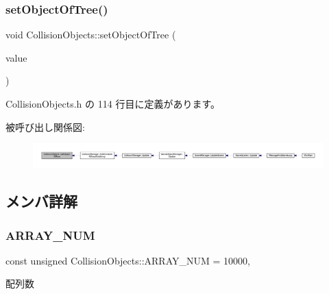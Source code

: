 \subsubsection{\texorpdfstring{set\+Object\+Of\+Tree()}{setObjectOfTree()}}
{\footnotesize\ttfamily void Collision\+Objects\+::set\+Object\+Of\+Tree (\begin{DoxyParamCaption}\item[{\mbox{\hyperlink{class_object_of_tree}{Object\+Of\+Tree}}$<$ \mbox{\hyperlink{class_collision_objects}{Collision\+Objects}} $\ast$$>$ $\ast$}]{value }\end{DoxyParamCaption})\hspace{0.3cm}{\ttfamily [inline]}}



 Collision\+Objects.\+h の 114 行目に定義があります。

被呼び出し関係図\+:
\nopagebreak
\begin{figure}[H]
\begin{center}
\leavevmode
\includegraphics[width=350pt]{class_collision_objects_a3d5a69741d66dcdebfae5a54a15c4b88_icgraph}
\end{center}
\end{figure}


\subsection{メンバ詳解}
\mbox{\label{class_collision_objects_a907cb151a9bbdd323eba56a4e4e1ee76}} 
\subsubsection{\texorpdfstring{A\+R\+R\+A\+Y\+\_\+\+N\+UM}{ARRAY\_NUM}}
{\footnotesize\ttfamily const unsigned Collision\+Objects\+::\+A\+R\+R\+A\+Y\+\_\+\+N\+UM = 10000\hspace{0.3cm}{\ttfamily [static]}, {\ttfamily [private]}}



配列数 



